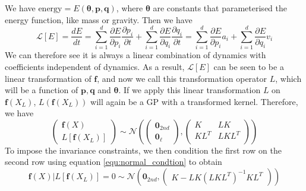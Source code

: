 \documentclass{statsmsc}
\begin{document}
We have $\text{energy}=E(\mathbf{\theta}, \mathbf{p}, \mathbf{q})$, where $\mathbf{\theta}$ are constants that parameterised the energy function, like mass or gravity.
Then we have 
\begin{equation}
\mathcal{L}[E] = \frac{dE}{dt}=\sum_{i=1}^d \frac{\partial E}{\partial p_i} \frac{\partial p_i}{\partial t}+ \sum_{i=1}^d\frac{\partial E}{\partial q_i}\frac{\partial q_i}{\partial t} =\sum_{i=1}^d \frac{\partial E}{\partial p_i} a_i + \sum_{i=1}^d\frac{\partial E}{\partial q_i} v_i
\label{equ:invariance_equation}
\end{equation}
We can therefore see it is always a linear combination of dynamics with coefficients independent of dynamics.
As a result, $\mathcal{L}[E]$ can be seen to be a linear transformation of $\mathbf{f}$, and now we call this transformation operator $L$, which will be a function of $\mathbf{p}, \mathbf{q}$ and $\mathbf{\theta}$.
If we apply this linear transformation $L$ on $\mathbf{f}(X_L)$, $L(\mathbf{f}(X_L))$ will again be a GP with a transformed kernel.
Therefore, we have 
\begin{equation}
\begin{pmatrix}
\mathbf{f}(X)\\L[\mathbf{f}(X_L)]
\end{pmatrix}
\sim\mathcal{N}
\left(\begin{pmatrix}\mathbf{0}_{2nd}\\\mathbf{0}_{\ell}\end{pmatrix}, \begin{pmatrix}
    K & LK \\
    KL^T & LKL^T\\
\end{pmatrix}\right)
\label{equ:invariance_joint}  
\end{equation}
To impose the invariance constraints, we then condition the first row on the second row using equation \ref{equ:normal_condtion} to obtain
\begin{equation}
  \mathbf{f}(X)|L[\mathbf{f}(X_L)]=0 \sim \mathcal{N} \left(\mathbf{0}_{2nd}, \begin{pmatrix}
    K-LK(LKL^T)^{-1}KL^T
  \end{pmatrix}\right)
  \label{equ:invariance_condition}
\end{equation}
\end{document}

